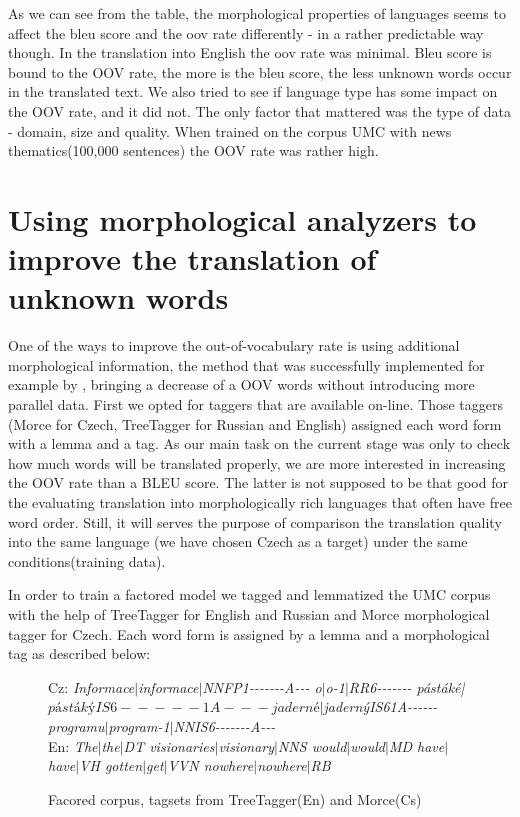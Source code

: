 \documentclass[11pt,letterpaper]{article}
\begin{document}
As we can see from the table, the morphological properties of languages seems to
affect the bleu score and the oov rate differently - in a rather predictable way though.
In the translation into English the oov rate was minimal. 
Bleu score is bound to the OOV rate, the more is the bleu  score, the less unknown words occur 
in the translated text.
We also tried to see if language type has some impact on the OOV rate, and it did not.
The only factor that mattered was the type of data - domain, size and quality. When 
trained on the corpus UMC with news thematics(100,000 sentences) the OOV rate was rather high.

\section{Using morphological analyzers to improve the translation of unknown words}

One of the ways to improve the out-of-vocabulary rate is using additional morphological
information, the method that was successfully implemented for example by \cite{turchi},
bringing a decrease of a OOV words without introducing more parallel data.
 First we opted for taggers that are available  on-line. Those taggers
(Morce for Czech, TreeTagger for Russian and English) assigned each word form with
a lemma and a tag. As our main task on the current stage was only to check
how much words will be translated properly, we are more interested in increasing
the OOV rate than a BLEU score. The latter is not supposed to be that 
good for the evaluating translation into morphologically rich languages that often have
free word order. Still, it will serves the purpose of comparison the translation 
quality into the same language (we have chosen Czech as a target) under the same conditions(training data).

In order to train a factored model we tagged and lemmatized the UMC corpus with
the help of TreeTagger %
for English and Russian and Morce
morphological tagger for Czech. %
Each word form is assigned by a lemma and a morphological tag as described below:

\begin{figure}
Cz: \textit{Informace$|$informace$|$NNFP1-{}-{}-{}-{}-{}-{}-A-{}-{}- o$|$o-1$|$RR6-{}-{}-{}-{}-{}-{}- 
pástáké|$pástákýIS6-{}-{}-{}-{}-1A-{}-{}- jaderné|$jadernýIS61A-{}-{}-{}-{}-{}- 
programu$|$program-1$|$NNIS6-{}-{}-{}-{}-{}-{}-A-{}-{}-}\\
En: \textit{The$|$the$|$DT visionaries$|$visionary$|$NNS would$|$would$|$MD have$|$have$|$VH gotten$|$get$|$VVN nowhere$|$nowhere$|$RB}
\caption{Facored corpus, tagsets from TreeTagger(En) and Morce(Cs)}
\label{fig:fact}
\end{figure}
\end{document}
